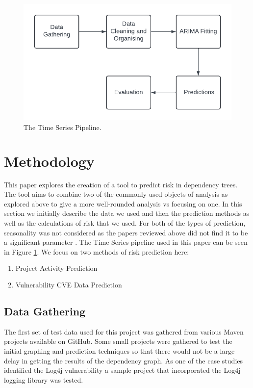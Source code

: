\documentclass[conference]{IEEEtran}
\begin{document}
\begin{figure}
\begin{center}
    \includegraphics[scale=0.5]{Pipeline.png}
    \caption{The Time Series Pipeline.}
    \label{fig:pipeline}
\end{center}
\end{figure}
\section{Methodology}
This paper explores the creation of a tool to predict risk in dependency trees. The tool aims to combine two of the commonly used objects of analysis as explored above to give a more well-rounded analysis vs focusing on one. In this section we initially describe the data we used and then the prediction methods as well as the calculations of risk that we used. For both of the types of prediction, seasonality was not considered as the papers reviewed above did not find it to be a significant parameter \cite{roumani_time_2015}. The Time Series pipeline used in this paper can be seen in Figure \ref{fig:pipeline}. We focus on two methods of risk prediction here: 
\begin{enumerate}
    \item Project Activity Prediction
    \item Vulnerability CVE Data Prediction
\end{enumerate}

\subsection{Data Gathering}
The first set of test data used for this project was gathered from various Maven projects available on GitHub. Some small projects were gathered to test the initial graphing and prediction techniques so that there would not be a large delay in getting the results of the dependency graph. As one of the case studies identified the Log4j vulnerability a sample project that incorporated the Log4j logging library was tested. 
\end{document}
